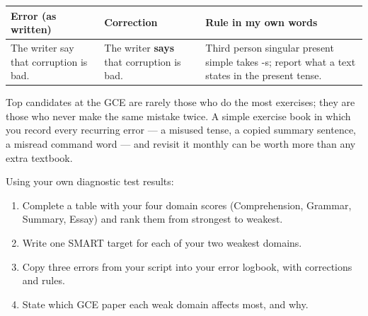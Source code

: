 \documentclass[11pt]{article}
\begin{document}
\begin{exemplebox}
\begin{center}
\begin{tabularx}{\linewidth}{|X|X|X|}
\hline
\rowcolor{popblueL} \textbf{Error (as written)} & \textbf{Correction} & \textbf{Rule in my own words} \\
\hline
The writer say that corruption is bad. & The writer \textbf{says} that corruption is bad. & Third person singular present simple takes -s; report what a text states in the present tense. \\
\hline
\end{tabularx}
\end{center}
\end{exemplebox}

\begin{savaistu}
Top candidates at the GCE are rarely those who do the most exercises; they are those who never make the same mistake twice. A simple exercise book in which you record every recurring error --- a misused tense, a copied summary sentence, a misread command word --- and revisit it monthly can be worth more than any extra textbook.
\end{savaistu}

\begin{exercice}
Using your own diagnostic test results:
\begin{enumerate}
\item Complete a table with your four domain scores (Comprehension, Grammar, Summary, Essay) and rank them from strongest to weakest.
\item Write one SMART target for each of your two weakest domains.
\item Copy three errors from your script into your error logbook, with corrections and rules.
\item State which GCE paper each weak domain affects most, and why.
\end{enumerate}
\end{exercice}
\end{document}
